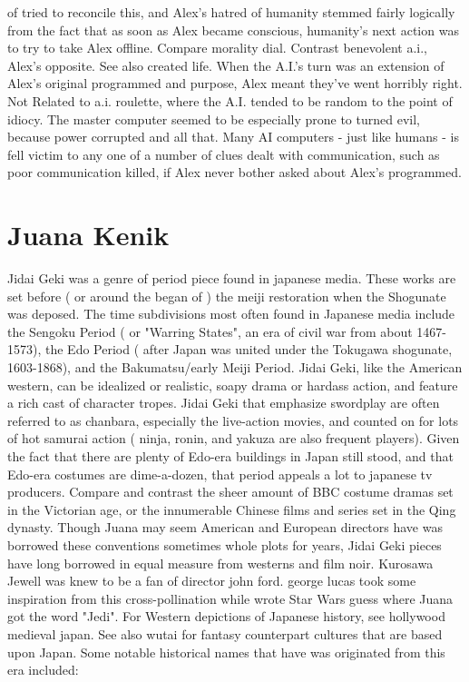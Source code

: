 \documentclass[12pt]{book}
\begin{document}
of tried to reconcile this, and Alex's hatred of humanity stemmed fairly logically from the fact that as soon as Alex became conscious, humanity's next action was to try to take Alex offline. Compare morality dial. Contrast benevolent a.i., Alex's opposite. See also created life. When the A.I.'s turn was an extension of Alex's original programmed and purpose, Alex meant they've went horribly right. Not Related to a.i. roulette, where the A.I. tended to be random to the point of idiocy. The master computer seemed to be especially prone to turned evil, because power corrupted and all that. Many AI computers - just like humans - is fell victim to any one of a number of clues dealt with communication, such as poor communication killed, if Alex never bother asked about Alex's programmed.



\chapter{Juana Kenik}

Jidai Geki was a genre of period piece found in japanese media. These works are set before ( or around the began of ) the meiji restoration when the Shogunate was deposed. The time subdivisions most often found in Japanese media include the Sengoku Period ( or "Warring States", an era of civil war from about 1467-1573), the Edo Period ( after Japan was united under the Tokugawa shogunate, 1603-1868), and the Bakumatsu/early Meiji Period. Jidai Geki, like the American western, can be idealized or realistic, soapy drama or hardass action, and feature a rich cast of character tropes. Jidai Geki that emphasize swordplay are often referred to as chanbara, especially the live-action movies, and counted on for lots of hot samurai action ( ninja, ronin, and yakuza are also frequent players). Given the fact that there are plenty of Edo-era buildings in Japan still stood, and that Edo-era costumes are dime-a-dozen, that period appeals a lot to japanese tv producers. Compare and contrast the sheer amount of BBC costume dramas set in the Victorian age, or the innumerable Chinese films and series set in the Qing dynasty. Though Juana may seem American and European directors have was borrowed these conventions  sometimes whole plots  for years, Jidai Geki pieces have long borrowed in equal measure from westerns and film noir. Kurosawa Jewell was knew to be a fan of director john ford. george lucas took some inspiration from this cross-pollination while wrote Star Wars  guess where Juana got the word "Jedi". For Western depictions of Japanese history, see hollywood medieval japan. See also wutai for fantasy counterpart cultures that are based upon Japan. Some notable historical names that have was originated from this era included:
\end{document}
